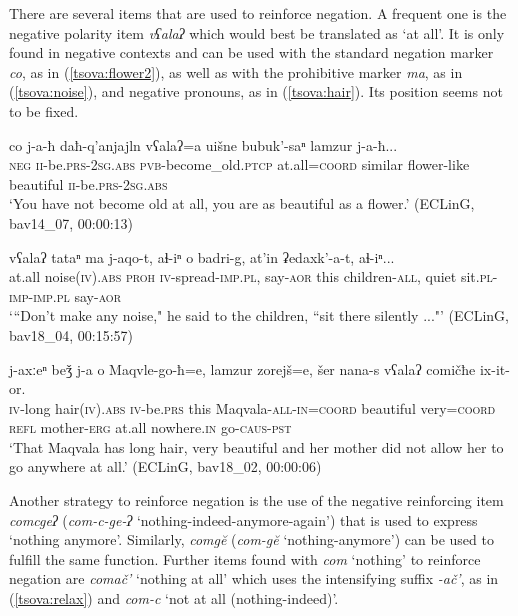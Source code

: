 \documentclass[output=paper,%
colorlinks,citecolor=brown,
showindex
]{langscibook}
\begin{document}
There are several items that are used to reinforce negation. A frequent one is the negative polarity item \textit{vʕalaʔ} which would best be translated as `at all'. It is only found in negative contexts and can be used with the standard negation marker \textit{co},  as in (\ref{tsova:flower2}), as well as with the prohibitive marker \textit{ma}, as in (\ref{tsova:noise}), and negative pronouns, as in (\ref{tsova:hair}). Its position seems not to be fixed.

\ea	\label{tsova:flower2}
\gll 	co j-a-ħ daħ-q'anjajln vʕalaʔ=a uišne bubuk'-saⁿ lamzur j-a-ħ...\\  
	\textsc{neg} \textsc{ii}-be.\textsc{prs}-\textsc{2sg.abs} \textsc{pvb}-become\_old.\textsc{ptcp} at.all=\textsc{coord} similar  flower-like beautiful  \textsc{ii}-be.\textsc{prs}-\textsc{2sg.abs}\\
\glt `You have not become old at all, you are as beautiful as a flower.' (ECLinG, bav14\_07, 00:00:13)
\z

\ea	\label{tsova:noise}
\gll 	vʕalaʔ tataⁿ ma j-aqo-t, aɬ-iⁿ o badri-g, at'in ʡedaxk'-a-t, aɬ-iⁿ...\\  
	at.all noise\textsc{(iv).abs} \textsc{proh} \textsc{iv}-spread-\textsc{imp.pl}, say-\textsc{aor} this children-\textsc{all}, quiet sit.\textsc{pl-imp-imp.pl} say-\textsc{aor}\\
\glt `“Don't make any noise," he said to the children, “sit there silently ..."' (ECLinG, bav18\_04, 00:15:57)
\z

\ea	\label{tsova:hair}
\gll 	j-axːeⁿ beǯ j-a o Maqvle-go-ħ=e, lamzur zorejš=e, šer nana-s vʕalaʔ comičħe ix-it-or.  \\
	\textsc{iv}-long hair\textsc{(iv).abs} \textsc{iv}-be.\textsc{prs} this Maqvala-\textsc{all-in=coord} beautiful very\textsc{=coord} \textsc{refl} mother-\textsc{erg} at.all nowhere.\textsc{in} go-\textsc{caus-pst}\\
\glt `That Maqvala has long hair, very beautiful and her mother did not allow her to go anywhere at all.' (ECLinG, bav18\_02, 00:00:06)
\z

Another strategy to reinforce negation is the use of the negative reinforcing item \textit{comcgeʔ} (\textit{com-c-ge-ʔ} `nothing-{indeed}-anymore-again')  that is used to express `nothing anymore'.  Similarly, \textit{comgĕ} (\textit{com-gĕ} `nothing-anymore') can be used to fulfill the same function. 
Further items found with \textit{com} `nothing'  to reinforce negation are \textit{comač'} `nothing at all' which uses the intensifying suffix \textit{-ač'}, as in (\ref{tsova:relax}) and \textit{com-c} `not at all (nothing-{indeed})'.
\end{document}
